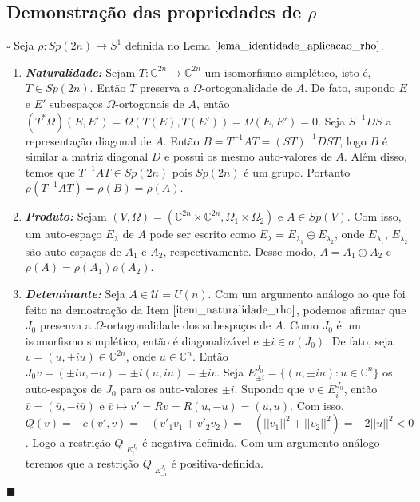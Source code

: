 \documentclass[12pt]{book}
\newenvironment{prova}[1]{$\square$ #1}{\hfill$\blacksquare$}
\newcommand{\circulo}{S^{1}}
\newcommand{\complexo}[1]{\mathbb{C}^{#1}}
\newcommand{\estruturacomplexa}{J_{0}}
\newcommand{\gruposimpletico}[1]{Sp(#1)}
\newcommand{\matrizunitaria}[1]{U(#1)}
\newcommand{\norma}[1]{||#1||}
\begin{document}
	\subsection*{Demonstração das propriedades de $\rho$}
	\begin{prova}
		Seja $\rho :\gruposimpletico{2n} \to \circulo$ definida no Lema $\ref{lema_identidade_aplicacao_rho}$.
		\begin{enumerate}
			\item \label{item_naturalidade_rho} \textbf{\textit{Naturalidade:}} Sejam $T : \complexo{2n} \to \complexo{2n}$ um isomorfismo simplético, isto é, $T\in \gruposimpletico{2n}$. Então $T$ preserva a $\Omega$-ortogonalidade de $A$. De fato, supondo $E$ e $E'$ subespaços $\Omega$-ortogonais de $A$, então $(T^{*}\Omega)(E, E') = \Omega(T(
			E), T(E')) = \Omega(E, E') = 0$. Seja $S^{-1}DS$ a representação diagonal de $A$. Então $B = T^{-1}AT = (ST)^{-1}DST$, logo $B$ é similar a matriz diagonal $D$ e possui os mesmo auto-valores de $A$. Além disso, temos que $T^{-1}AT\in \gruposimpletico{2n}$ pois $\gruposimpletico{2n}$ é um grupo. Portanto $\rho(T^{-1}AT) = \rho(B) = \rho(A)$. 
			
			\item \textbf{\textit{Produto:}} Sejam $(V, \Omega) = (\complexo{2n}\times \complexo{2n}, \Omega_{1}\times \Omega_{2})$ e $A \in \gruposimpletico{V}$. Com isso, um auto-espaço $E_{\lambda}$ de $A$ pode ser escrito como $E_{\lambda} = E_{\lambda_{1}}\oplus E_{\lambda_{2}}$, onde $E_{\lambda_{1}}$, $E_{\lambda_{2}}$ são auto-espaços de $A_{1}$ e $A_{2}$, respectivamente. Desse modo, $A = A_{1}\oplus A_{2}$ e $\rho(A) = \rho(A_{1})\rho(A_{2})$.
			
			
			\item \textbf{\textit{Deteminante:}} Seja $A \in \mathcal{U} = \matrizunitaria{n}$. Com um argumento análogo ao que foi feito na demostração da Item $\ref{item_naturalidade_rho}$, podemos afirmar que $\estruturacomplexa$ presenva a $\Omega$-ortogonalidade dos subespaços de $A$. Como $\estruturacomplexa$ é um isomorfismo simplético, então é diagonalizável  e $\pm i \in \sigma(\estruturacomplexa)$. De fato, seja $v = (u, \pm iu) \in \complexo{2n}$, onde $u \in \complexo{n}$. Então $\estruturacomplexa v = (\pm iu, -u) = \pm i(u,iu) = \pm iv$. Seja $E^{\estruturacomplexa}_{\pm i} = \{(u, \pm i u):u \in \complexo{n} \}$ os auto-espaços de $\estruturacomplexa$ para os auto-valores $\pm i$.
			Supondo que $v \in E^{\estruturacomplexa}_{ i}$, então $\overline{v} = (\overline{u}, -i \overline{u})$ e $\overline{v} \mapsto v' = Rv = R(u, -u) = (u,u)$. Com isso, $Q(v) = -c(v', v) = -(v'_{1}v_{1}+v'_{2}v_{2}) = -(\norma{v_{1}}^{2}+\norma{v_{2}}^{2}) =-2\norma{u}^{2}<0$. Logo a restrição $Q|_{E^{\estruturacomplexa}_{ i}}$ é negativa-definida. Com um argumento análogo teremos que a restrição $Q|_{E^{\estruturacomplexa}_{-i}}$ é positiva-definida.
			

\end{enumerate}
\end{prova}
\end{document}

